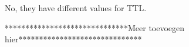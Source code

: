 No, they have different values for TTL.

******************************Meer toevoegen hier******************************